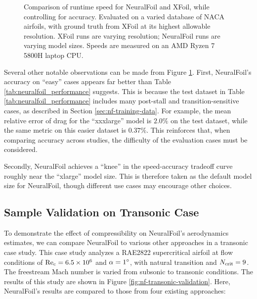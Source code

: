     \begin{figure}[H]
        \centering
        
        \caption{Comparison of runtime speed for NeuralFoil and XFoil, while controlling for accuracy. Evaluated on a varied database of NACA airfoils, with ground truth from XFoil at its highest allowable resolution. XFoil runs are varying resolution; NeuralFoil runs are varying model sizes. Speeds are measured on an AMD Ryzen 7 5800H laptop CPU.}
        \label{fig:nf-accuracy-speed}
    \end{figure}

    Several other notable observations can be made from Figure \ref{fig:nf-accuracy-speed}. First, NeuralFoil's accuracy on ``easy'' cases appears far better than Table \ref{tab:neuralfoil_performance} suggests. This is because the test dataset in Table \ref{tab:neuralfoil_performance} includes many post-stall and transition-sensitive cases, as described in Section \ref{sec:nf-training-data}. For example, the mean relative error of drag for the ``xxxlarge'' model is $2.0\%$ on the test dataset, while the same metric on this easier dataset is $0.37\%$. This reinforces that, when comparing accuracy across studies, the difficulty of the evaluation cases must be considered.

    Secondly, NeuralFoil achieves a ``knee'' in the speed-accuracy tradeoff curve roughly near the ``xlarge'' model size. This is therefore taken as the default model size for NeuralFoil, though different use cases may encourage other choices.

    \subsection{Sample Validation on Transonic Case}
    \label{sec:nf-validation-transonic}

    To demonstrate the effect of compressibility on NeuralFoil's aerodynamics estimates, we can compare NeuralFoil to various other approaches in a transonic case study. This case study analyzes a RAE2822 supercritical airfoil at flow conditions of $\rm Re_c=6.5 \times 10^6$ and $\alpha=1\degree$, with natural transition and $N_{\rm crit}=9$. The freestream Mach number is varied from subsonic to transonic conditions. The results of this study are shown in Figure \ref{fig:nf-transonic-validation}. Here, NeuralFoil's results are compared to those from four existing approaches:

